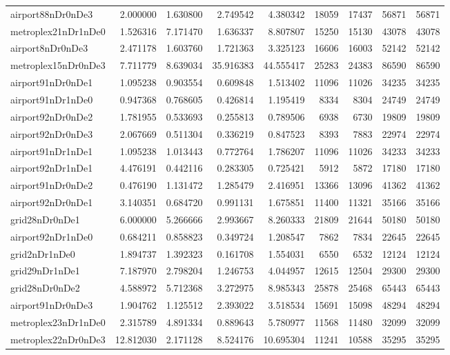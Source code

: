 \begin{longtable}{|l|r|r|r|r|r|r|r|r|}
airport88nDr0nDe3 & 2.000000 & 1.630800 & 2.749542 & 4.380342 & 18059 & 17437 & 56871 & 56871 \\
metroplex21nDr1nDe0 & 1.526316 & 7.171470 & 1.636337 & 8.807807 & 15250 & 15130 & 43078 & 43078 \\
airport8nDr0nDe3 & 2.471178 & 1.603760 & 1.721363 & 3.325123 & 16606 & 16003 & 52142 & 52142 \\
metroplex15nDr0nDe3 & 7.711779 & 8.639034 & 35.916383 & 44.555417 & 25283 & 24383 & 86590 & 86590 \\
airport91nDr0nDe1 & 1.095238 & 0.903554 & 0.609848 & 1.513402 & 11096 & 11026 & 34235 & 34235 \\
airport91nDr1nDe0 & 0.947368 & 0.768605 & 0.426814 & 1.195419 & 8334 & 8304 & 24749 & 24749 \\
airport92nDr0nDe2 & 1.781955 & 0.533693 & 0.255813 & 0.789506 & 6938 & 6730 & 19809 & 19809 \\
airport92nDr0nDe3 & 2.067669 & 0.511304 & 0.336219 & 0.847523 & 8393 & 7883 & 22974 & 22974 \\
airport91nDr1nDe1 & 1.095238 & 1.013443 & 0.772764 & 1.786207 & 11096 & 11026 & 34233 & 34233 \\
airport92nDr1nDe1 & 4.476191 & 0.442116 & 0.283305 & 0.725421 & 5912 & 5872 & 17180 & 17180 \\
airport91nDr0nDe2 & 0.476190 & 1.131472 & 1.285479 & 2.416951 & 13366 & 13096 & 41362 & 41362 \\
airport92nDr0nDe1 & 3.140351 & 0.684720 & 0.991131 & 1.675851 & 11400 & 11321 & 35166 & 35166 \\
grid28nDr0nDe1 & 6.000000 & 5.266666 & 2.993667 & 8.260333 & 21809 & 21644 & 50180 & 50180 \\
airport92nDr1nDe0 & 0.684211 & 0.858823 & 0.349724 & 1.208547 & 7862 & 7834 & 22645 & 22645 \\
grid2nDr1nDe0 & 1.894737 & 1.392323 & 0.161708 & 1.554031 & 6550 & 6532 & 12124 & 12124 \\
grid29nDr1nDe1 & 7.187970 & 2.798204 & 1.246753 & 4.044957 & 12615 & 12504 & 29300 & 29300 \\
grid28nDr0nDe2 & 4.588972 & 5.712368 & 3.272975 & 8.985343 & 25878 & 25468 & 65443 & 65443 \\
airport91nDr0nDe3 & 1.904762 & 1.125512 & 2.393022 & 3.518534 & 15691 & 15098 & 48294 & 48294 \\
metroplex23nDr1nDe0 & 2.315789 & 4.891334 & 0.889643 & 5.780977 & 11568 & 11480 & 32099 & 32099 \\
metroplex22nDr0nDe3 & 12.812030 & 2.171128 & 8.524176 & 10.695304 & 11241 & 10588 & 35295 & 35295 \\

\end{longtable}
